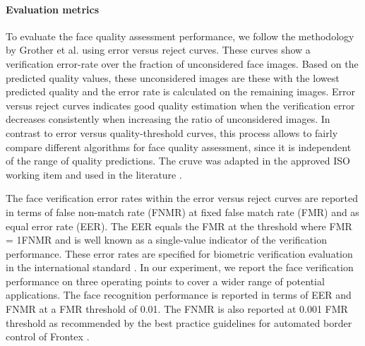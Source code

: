 \documentclass[10pt,twocolumn,letterpaper]{article}
\begin{document}
\paragraph{Evaluation metrics}














To evaluate the face quality assessment performance, we follow the methodology by Grother et al. \cite{DBLP:journals/pami/GrotherT07} using error versus reject curves.
These curves show a verification error-rate over the fraction of unconsidered face images.
Based on the predicted quality values, these unconsidered images are these with the lowest predicted quality and the error rate is calculated on the remaining images.
Error versus reject curves indicates good quality estimation when the verification error decreases consistently when increasing the ratio of unconsidered images.
In contrast to error versus quality-threshold curves, this process allows to fairly compare different algorithms for face quality assessment, since it is independent of the range of quality predictions.
The cruve was adapted in the approved ISO working item \cite{ISO} and used in the literature \cite{DBLP:journals/corr/Best-RowdenJ17, DBLP:reference/bio/TabassiG15, VendorTest}.



The face verification error rates within the error versus reject curves are reported in terms of false non-match rate (FNMR) at fixed false match rate (FMR) and as equal error rate (EER).
The EER equals the FMR at the threshold where FMR = 1FNMR and is well known as a single-value indicator of the verification performance.
These error rates are specified for biometric verification evaluation in the international standard \cite{ISO_Metrik}.
In our experiment, we report the face verification performance on three operating points to cover a wider range of potential applications.
The face recognition performance is reported in terms of EER and FNMR at a FMR threshold of 0.01.
The FNMR is also reported at 0.001 FMR threshold as recommended by the best practice guidelines for automated border control of Frontex \cite{FrontexBestPractice}.
\end{document}

